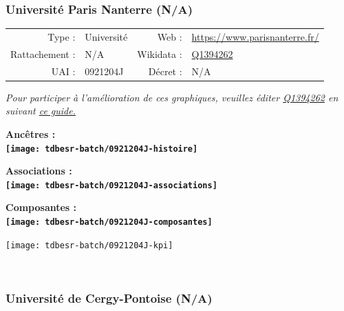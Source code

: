 \documentclass[12pt,french,]{article}
\begin{document}
\hypertarget{universituxe9-paris-nanterre-na}{%
\subsubsection{Université Paris Nanterre
(N/A)}\label{universituxe9-paris-nanterre-na}}

\begin{tabular*}{\textwidth}{rp{5cm}rl}  
\hline  
Type : & Université & Web : &\href{https://www.parisnanterre.fr/}{https://www.parisnanterre.fr/} \\  
Rattachement : & N/A & Wikidata : & \href{https://www.wikidata.org/entity/Q1394262}{Q1394262} \\  
UAI : & 0921204J & Décret : & N/A \\  
\hline  
\end{tabular*}

\textit{\scriptsize Pour participer à l'amélioration de ces graphiques, veuillez éditer  \href{https://www.wikidata.org/entity/Q1394262}{Q1394262}  en suivant \href{https://github.com/cpesr/wikidataESR/blob/master/Rmd/wikidataESR.md}{ce guide.}}

\vspace{1cm}  
\begin{minipage}[b]{0.50\textwidth}\begin{center} \bf Ancêtres : \\  
\texttt{[image: tdbesr-batch/0921204J-histoire]} \end{center}\end{minipage}\begin{minipage}[b]{0.50\textwidth}\begin{center} \bf Associations : \\  
\texttt{[image: tdbesr-batch/0921204J-associations]} \end{center}\end{minipage}

\hrulefill

\begin{center} \bf Composantes : \\  
\texttt{[image: tdbesr-batch/0921204J-composantes]} \end{center}

\begin{center}\texttt{[image: tdbesr-batch/0921204J-kpi]} \end{center}\checkoddpage

\ifoddpage \fi ~\newpage  

\hypertarget{universituxe9-de-cergy-pontoise-na}{%
\subsubsection{Université de Cergy-Pontoise
(N/A)}\label{universituxe9-de-cergy-pontoise-na}}
\end{document}
